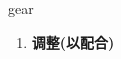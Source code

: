 
\begin{frame}
{\huge gear}
\begin{center}
\begin{enumerate}\Large
  \item \textbf{调整(以配合)}
\end{enumerate}
\end{center}
\end{frame}
